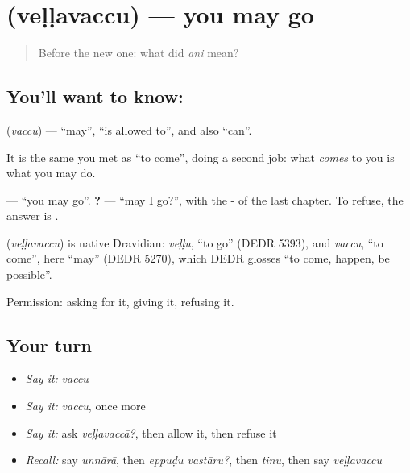 \section[\texorpdfstring{\te{వెళ్ళవచ్చు} (veḷḷavaccu)}{వెళ్ళవచ్చు (veḷḷavaccu)}]{ (veḷḷavaccu) — you may go}

\label{lesson:TE-C80-may}



\begin{quote}
Before the new one: what did \emph{ani} mean?
\end{quote}

\subsection*{You'll want to know: }
\textbf{} (\emph{vaccu}) — \textquotedblleft{}may\textquotedblright{}, \textquotedblleft{}is allowed to\textquotedblright{}, and also \textquotedblleft{}can\textquotedblright{}.

It is the same  you met as \textquotedblleft{}to come\textquotedblright{}, doing a second job: what \emph{comes} to you is what you may do.

\textbf{} — \textquotedblleft{}you may go\textquotedblright{}. \textbf{?} — \textquotedblleft{}may I go?\textquotedblright{}, with the - of the last chapter. To refuse, the answer is \textbf{}.

\begin{cousinweb}
\textbf{} (\emph{veḷḷavaccu}) is native Dravidian: \emph{veḷḷu}, \textquotedblleft{}to go\textquotedblright{} (DEDR 5393), and \emph{vaccu}, \textquotedblleft{}to come\textquotedblright{}, here \textquotedblleft{}may\textquotedblright{} (DEDR 5270), which DEDR glosses \textquotedblleft{}to come, happen, be possible\textquotedblright{}.
\end{cousinweb}

\begin{grammarlens}[title={What you've built}]
Permission: asking for it, giving it, refusing it.
\end{grammarlens}

\subsection*{Your turn}
\begin{itemize}
\raggedright
  \item \emph{Say it:} \emph{vaccu}
  \item \emph{Say it:} \emph{vaccu}, once more
  \item \emph{Say it:} ask \emph{veḷḷavaccā?}, then allow it, then refuse it
  \item \emph{Recall:} say \emph{unnārā}, then \emph{eppuḍu vastāru?}, then \emph{tinu}, then say \emph{veḷḷavaccu}
\end{itemize}

